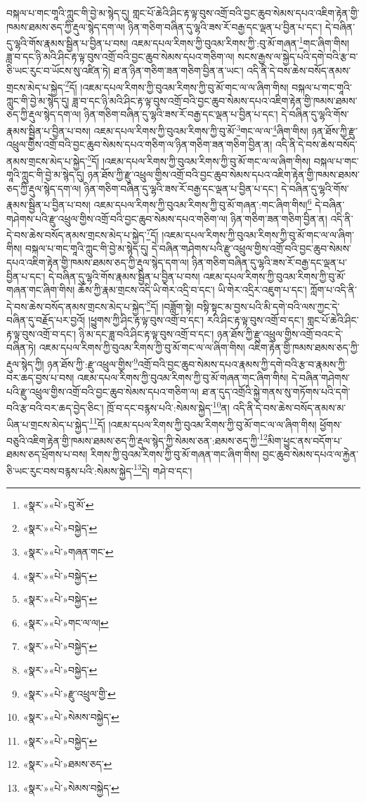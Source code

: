 བསྐལ་པ་གང་གཱའི་ཀླུང་གི་བྱེ་མ་སྙེད་དུ། གླང་པོ་ཆེའི་ཤིང་རྟ་ལྟ་བུས་འགྲོ་བའི་བྱང་ཆུབ་སེམས་དཔའ་འཇིག་རྟེན་གྱི་ཁམས་ཐམས་ཅད་ཀྱི་རྡུལ་སྙེད་དག་ལ། ཉིན་གཅིག་བཞིན་དུ་ལྷའི་ཟས་རོ་བརྒྱ་དང་ལྡན་པ་བྱིན་པ་དང་། དེ་བཞིན་དུ་ལྷའི་གོས་རྣམས་སྦྱིན་པ་བྱིན་པ་བས། འཇམ་དཔལ་རིགས་ཀྱི་བུའམ་རིགས་ཀྱི་:བུ་མོ་གཞན་\footnote{«སྣར་»«པེ་»བུ་མོ་}གང་ཞིག་གིས། ཟླ་བ་དང་ཉི་མའི་ཤིང་རྟ་ལྟ་བུས་འགྲོ་བའི་བྱང་ཆུབ་སེམས་དཔའ་གཅིག་ལ། སངས་རྒྱས་ལ་སྐྱེད་པའི་དགེ་བའི་རྩ་བ་ཅི་ཡང་རུང་བ་ཡོངས་སུ་འཛིན་ཏེ། ཐ་ན་ཉིན་གཅིག་ཟན་གཅིག་བྱིན་ན་ཡང་། འདི་ནི་དེ་བས་ཆེས་བསོད་ནམས་གྲངས་མེད་པ་སྐྱེད་\footnote{«སྣར་»«པེ་»བསྐྱེད་}དོ། །འཇམ་དཔལ་རིགས་ཀྱི་བུའམ་རིགས་ཀྱི་བུ་མོ་གང་ལ་ལ་ཞིག་གིས། བསྐལ་པ་གང་གཱའི་ཀླུང་གི་བྱེ་མ་སྙེད་དུ། ཟླ་བ་དང་ཉི་མའི་ཤིང་རྟ་ལྟ་བུས་འགྲོ་བའི་བྱང་ཆུབ་སེམས་དཔའ་འཇིག་རྟེན་གྱི་ཁམས་ཐམས་ཅད་ཀྱི་རྡུལ་སྙེད་དག་ལ། ཉིན་གཅིག་བཞིན་དུ་ལྷའི་ཟས་རོ་བརྒྱ་དང་ལྡན་པ་བྱིན་པ་དང་། དེ་བཞིན་དུ་ལྷའི་གོས་རྣམས་སྦྱིན་པ་བྱིན་པ་བས། འཇམ་དཔལ་རིགས་ཀྱི་བུའམ་རིགས་ཀྱི་བུ་མོ་\footnote{«སྣར་»«པེ་»གཞན་གང་}གང་ལ་ལ་\footnote{«སྣར་»«པེ་»བསྐྱེད་}ཞིག་གིས། ཉན་ཐོས་ཀྱི་རྫུ་འཕྲུལ་གྱིས་འགྲོ་བའི་བྱང་ཆུབ་སེམས་དཔའ་གཅིག་ལ་ཉིན་གཅིག་ཟན་གཅིག་བྱིན་ན། འདི་ནི་དེ་བས་ཆེས་བསོད་ནམས་གྲངས་མེད་པ་སྐྱེད་\footnote{«སྣར་»«པེ་»བསྐྱེད་}དོ། །འཇམ་དཔལ་རིགས་ཀྱི་བུའམ་རིགས་ཀྱི་བུ་མོ་གང་ལ་ལ་ཞིག་གིས། བསྐལ་པ་གང་གཱའི་ཀླུང་གི་བྱེ་མ་སྙེད་དུ། ཉན་ཐོས་ཀྱི་རྫུ་འཕྲུལ་གྱིས་འགྲོ་བའི་བྱང་ཆུབ་སེམས་དཔའ་འཇིག་རྟེན་གྱི་ཁམས་ཐམས་ཅད་ཀྱི་རྡུལ་སྙེད་དག་ལ། ཉིན་གཅིག་བཞིན་དུ་ལྷའི་ཟས་རོ་བརྒྱ་དང་ལྡན་པ་བྱིན་པ་དང་། དེ་བཞིན་དུ་ལྷའི་གོས་རྣམས་སྦྱིན་པ་བྱིན་པ་བས། འཇམ་དཔལ་རིགས་ཀྱི་བུའམ་རིགས་ཀྱི་བུ་མོ་གཞན་:གང་ཞིག་གིས།\footnote{«སྣར་»«པེ་»གང་ལ་ལ།} དེ་བཞིན་གཤེགས་པའི་རྫུ་འཕྲུལ་གྱིས་འགྲོ་བའི་བྱང་ཆུབ་སེམས་དཔའ་གཅིག་ལ། ཉིན་གཅིག་ཟན་གཅིག་བྱིན་ན། འདི་ནི་དེ་བས་ཆེས་བསོད་ནམས་གྲངས་མེད་པ་སྐྱེད་\footnote{«སྣར་»«པེ་»བསྐྱེད་}དོ། །འཇམ་དཔལ་རིགས་ཀྱི་བུའམ་རིགས་ཀྱི་བུ་མོ་གང་ལ་ལ་ཞིག་གིས། བསྐལ་པ་གང་གཱའི་ཀླུང་གི་བྱེ་མ་སྙེད་དུ། དེ་བཞིན་གཤེགས་པའི་རྫུ་འཕྲུལ་གྱིས་འགྲོ་བའི་བྱང་ཆུབ་སེམས་དཔའ་འཇིག་རྟེན་གྱི་ཁམས་ཐམས་ཅད་ཀྱི་རྡུལ་སྙེད་དག་ལ། ཉིན་གཅིག་བཞིན་དུ་ལྷའི་ཟས་རོ་བརྒྱ་དང་ལྡན་པ་བྱིན་པ་དང་། དེ་བཞིན་དུ་ལྷའི་གོས་རྣམས་སྦྱིན་པ་བྱིན་པ་བས། འཇམ་དཔལ་རིགས་ཀྱི་བུའམ་རིགས་ཀྱི་བུ་མོ་གཞན་གང་ཞིག་གིས། ཆོས་ཀྱི་རྣམ་གྲངས་འདི་ཡི་གེར་འདྲི་བ་དང་། ཡི་གེར་འདྲིར་འཇུག་པ་དང་། ཀློག་པ་འདི་ནི་དེ་བས་ཆེས་བསོད་ནམས་གྲངས་མེད་པ་སྐྱེད་\footnote{«སྣར་»«པེ་»བསྐྱེད་}དོ། །བཟློག་སྟེ། བསྟི་སྟང་མ་བྱས་པའི་མི་དགེ་བའི་ལས་ཀྱང་དེ་བཞིན་དུ་བརྗོད་པར་བྱའོ། །ཕྱུགས་ཀྱི་ཤིང་རྟ་ལྟ་བུས་འགྲོ་བ་དང་། རའི་ཤིང་རྟ་ལྟ་བུས་འགྲོ་བ་དང་། གླང་པོ་ཆེའི་ཤིང་རྟ་ལྟ་བུས་འགྲོ་བ་དང་། ཉི་མ་དང་ཟླ་བའི་ཤིང་རྟ་ལྟ་བུས་འགྲོ་བ་དང་། ཉན་ཐོས་ཀྱི་རྫུ་འཕྲུལ་གྱིས་འགྲོ་བའང་དེ་བཞིན་ཏེ། འཇམ་དཔལ་རིགས་ཀྱི་བུའམ་རིགས་ཀྱི་བུ་མོ་གང་ལ་ལ་ཞིག་གིས། འཇིག་རྟེན་གྱི་ཁམས་ཐམས་ཅད་ཀྱི་རྡུལ་སྙེད་ཀྱི། ཉན་ཐོས་ཀྱི་:རྫུ་འཕྲུལ་གྱིས་\footnote{«སྣར་»«པེ་»རྫུ་འཕྲུལ་གྱི་}འགྲོ་བའི་བྱང་ཆུབ་སེམས་དཔའ་རྣམས་ཀྱི་དགེ་བའི་རྩ་བ་རྣམས་ཀྱི་བར་ཆད་བྱས་པ་བས། འཇམ་དཔལ་རིགས་ཀྱི་བུའམ་རིགས་ཀྱི་བུ་མོ་གཞན་གང་ཞིག་གིས། དེ་བཞིན་གཤེགས་པའི་རྫུ་འཕྲུལ་གྱིས་འགྲོ་བའི་བྱང་ཆུབ་སེམས་དཔའ་གཅིག་ལ། ཐ་ན་དུད་འགྲོའི་སྐྱེ་གནས་སུ་གཏོགས་པའི་དགེ་བའི་རྩ་བའི་བར་ཆད་བྱེད་ཅིང་། ཁྲོ་བ་དང་བརྙས་པའི་:སེམས་སྐྱེད་\footnote{«སྣར་»«པེ་»སེམས་བསྐྱེད་}ན། འདི་ནི་དེ་བས་ཆེས་བསོད་ནམས་མ་ཡིན་པ་གྲངས་མེད་པ་སྐྱེད་\footnote{«སྣར་»«པེ་»བསྐྱེད་}དོ། །འཇམ་དཔལ་རིགས་ཀྱི་བུའམ་རིགས་ཀྱི་བུ་མོ་གང་ལ་ལ་ཞིག་གིས། ཕྱོགས་བཅུའི་འཇིག་རྟེན་གྱི་ཁམས་ཐམས་ཅད་ཀྱི་རྡུལ་སྙེད་ཀྱི་སེམས་ཅན་:ཐམས་ཅད་ཀྱི་\footnote{«སྣར་»«པེ་»ཐམས་ཅད་}མིག་ཕྱུང་ནས་བདོག་པ་ཐམས་ཅད་ཕྲོགས་པ་བས། རིགས་ཀྱི་བུའམ་རིགས་ཀྱི་བུ་མོ་གཞན་གང་ཞིག་གིས། བྱང་ཆུབ་སེམས་དཔའ་ལ་རྐྱེན་ཅི་ཡང་རུང་བས་བརྙས་པའི་:སེམས་སྐྱེད་\footnote{«སྣར་»«པེ་»སེམས་བསྐྱེད་}དེ། གཤེ་བ་དང་། 